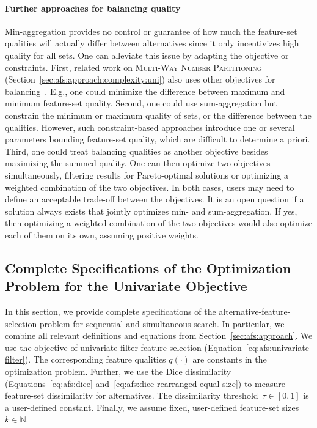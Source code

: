 \documentclass[iicol, sn-basic, Numbered]{sn-jnl} %
\theoremstyle{plain}
\theoremstyle{definition}
\begin{document}
\begin{appendices}
\paragraph{Further approaches for balancing quality}

Min-aggregation provides no control or guarantee of how much the feature-set qualities will actually differ between alternatives since it only incentivizes high quality for all sets.
One can alleviate this issue by adapting the objective or constraints.
First, related work on \textsc{Multi-Way Number Partitioning} (Section~\ref{sec:afs:approach:complexity:uni}) also uses other objectives for balancing~\cite{korf2010objective, lawrinenko2017identical}.
E.g., one could minimize the difference between maximum and minimum feature-set quality.
Second, one could use sum-aggregation but constrain the minimum or maximum quality of sets, or the difference between the qualities.
However, such constraint-based approaches introduce one or several parameters bounding feature-set quality, which are difficult to determine a priori.
Third, one could treat balancing qualities as another objective besides maximizing the summed quality.
One can then optimize two objectives simultaneously, filtering results for Pareto-optimal solutions or optimizing a weighted combination of the two objectives.
In both cases, users may need to define an acceptable trade-off between the objectives.
It is an open question if a solution always exists that jointly optimizes min- and sum-aggregation.
If yes, then optimizing a weighted combination of the two objectives would also optimize each of them on its own, assuming positive weights.

\subsection{Complete Specifications of the Optimization Problem for the Univariate Objective}
\label{sec:afs:appendix:univariate-complete-optimization-problem}

In this section, we provide complete specifications of the alternative-feature-selection problem for sequential and simultaneous search.
In particular, we combine all relevant definitions and equations from Section~\ref{sec:afs:approach}.
We use the objective of univariate filter feature selection (Equation~\ref{eq:afs:univariate-filter}).
The corresponding feature qualities $q(\cdot)$ are constants in the optimization problem.
Further, we use the Dice dissimilarity (Equations~\ref{eq:afs:dice} and~\ref{eq:afs:dice-rearranged-equal-size}) to measure feature-set dissimilarity for alternatives.
The dissimilarity threshold~$\tau \in [0,1]$ is a user-defined constant.
Finally, we assume fixed, user-defined feature-set sizes~$k \in \mathbb{N}$.


\end{appendices}
\end{document}
